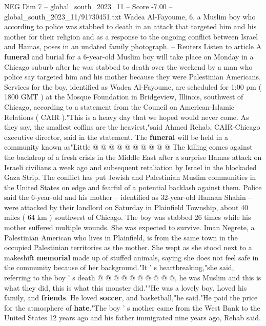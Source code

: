 \begin{textsample}{NEG Dim 7 – global\_south\_2023\_11 – Score -7.00 – global\_south\_2023\_11/91730451.txt}  \label{ex:f7_neg_324}
Wadea Al-Fayoume, 6, a Muslim boy who according to police was stabbed to death in an attack that targeted him and his mother for their religion and as a response to the ongoing conflict between Israel and Hamas, poses in an undated family photograph. -- Reuters Listen to article A \textbf{funeral} and burial for a 6-year-old Muslim boy will take place on Monday in a Chicago suburb after he was stabbed to death over the weekend by a man who police say targeted him and his mother because they were Palestinian Americans.
Services for the boy, identified as Wadea Al-Fayoume, are scheduled for 1:00 pm ( 1800 GMT ) at the Mosque Foundation in Bridgeview, Illinois, southwest of Chicago, according to a statement from the Council on American-Islamic Relations ( CAIR )."This is a heavy day that we hoped would never come.
As they say, the smallest coffins are the heaviest,"said Ahmed Rehab, CAIR-Chicago executive director, said in the statement.
The \textbf{funeral} will be held in a community known as"Little @ @ @ @ @ @ @ @ @ @ The killing comes against the backdrop of a fresh crisis in the Middle East after a surprise Hamas attack on Israeli civilians a week ago and subsequent retaliation by Israel in the blockaded Gaza Strip.
The conflict has put Jewish and Palestinian Muslim communities in the United States on edge and fearful of a potential backlash against them.
Police said the 6-year-old and his mother -- identified as 32-year-old Hanaan Shahin -- were attacked by their landlord on Saturday in Plainfield Township, about 40 miles ( 64 km ) southwest of Chicago.
The boy was stabbed 26 times while his mother suffered multiple wounds.
She was expected to survive.
Iman Negrete, a Palestinian American who lives in Plainfield, is from the same town in the occupied Palestinian territories as the mother.
She wept as she stood next to a makeshift \textbf{memorial} made up of stuffed animals, saying she does not feel safe in the community because of her background."It ' s heartbreaking,"she said, referring to the boy ' s death @ @ @ @ @ @ @ @ @ @, he was Muslim and this is what they did, this is what this monster did.""He was a lovely boy.
Loved his family, and \textbf{friends}.
He loved \textbf{soccer}, and basketball,"he said."He paid the price for the atmosphere of \textbf{hate}."The boy ' s mother came from the West Bank to the United States 12 years ago and his father immigrated nine years ago, Rehab said.

\end{textsample}
